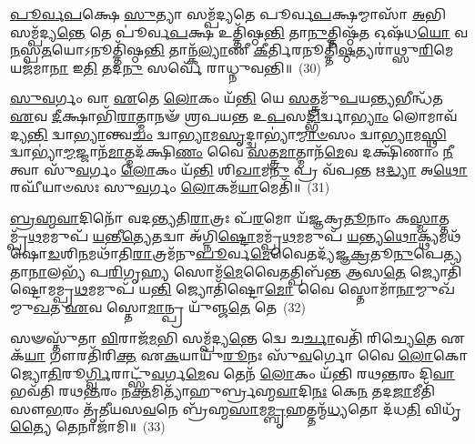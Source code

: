 \-\ul{𑌪𑍂}\-\-\ul{𑌰𑍍𑌵}\-\-\ul{𑌪}\-𑌕𑍍𑌷𑍇 \ul{𑌸𑍁}\-𑌤𑍍𑌯𑌾 𑌸𑌮𑍍𑌪᳴𑌦𑍍𑌯𑌤𑍇 𑌪𑍂𑌰𑍍𑌵\-\ul{𑌪}\-𑌕𑍍𑌷𑌮𑍍𑌮𑌾𑌸𑌾᳴ \ul{𑌅}\-𑌭𑌿 𑌸𑌮𑍍𑌪᳴𑌦𑍍𑌯\-\ul{𑌨𑍍𑌤𑍇} 𑌤𑍇 𑌪𑍂॑𑌰𑍍𑌵\-\ul{𑌪}\-𑌕𑍍𑌷 𑌉𑌤𑍍𑌤𑌿᳴𑌷𑍍𑌠\-\ul{𑌨𑍍𑌤𑌿} 𑌤𑌾\-\ul{𑌨𑍁}\-𑌤𑍍𑌤𑌿𑌷𑍍𑌠᳴\-\ul{𑌤} 𑌓𑌷᳴𑌧\-\ul{𑌯𑍋} 𑌵\-\ul{𑌨}\-𑌸𑍍𑌪\-\ul{𑌤}\-𑌯𑍋\-𑌽𑌨𑍂𑌤𑍍𑌤𑌿᳴𑌷𑍍𑌠\-\ul{𑌨𑍍𑌤𑌿} 𑌤𑌾𑌨𑍍𑌕᳴\-\ul{𑌲𑍍𑌯𑌾}\-𑌣𑍀 \ul{𑌕𑍀}\-𑌰𑍍𑌤𑌿𑌰𑌨𑍂𑌤𑍍𑌤𑌿᳴\-\ul{𑌷𑍍𑌠}\-𑌤𑍍𑌯𑌰𑌾॑𑌥𑍍𑌸𑍁\-\ul{𑌰𑌿}\-𑌮𑍇 𑌯𑌜᳴𑌮𑌾\-\ul{𑌨𑌾} 𑌇\-\ul{𑌤𑌿} 𑌤𑌦\-\ul{𑌨𑍁} 𑌸𑌰𑍍𑌵𑍇᳴ 𑌰𑌾𑌧𑍍𑌨𑍁𑌵𑌨𑍍𑌤𑌿॥~(30)

{\anuvakamend[{\-\ul{𑌏}\-𑌤\-\ul{𑌚𑍍𑌛}\-𑌮𑍍𑌬𑌟𑍍𑌕𑍁᳴𑌰𑍍𑌵\-\ul{𑌨𑍍𑌤𑌿} 𑌤𑍇\-\ul{𑌷𑌾}\-𑌞𑍍𑌚𑌤𑍁᳴𑌸𑍍𑌤𑍍𑌰𑌿𑍞𑌶𑌚𑍍𑌚}]}%

\-\ul{𑌸𑍁}\-\-\ul{𑌵}\-𑌰𑍍𑌗𑌂 𑌵𑌾 \ul{𑌏}\-𑌤𑍇 \ul{𑌲𑍋}\-𑌕𑌂 𑌯᳴\-\ul{𑌨𑍍𑌤𑌿} 𑌯𑍇 \ul{𑌸}\-𑌤𑍍𑌤𑍍𑌰𑌮𑍁᳴\-\ul{𑌪}\-𑌯\-\ul{𑌨𑍍𑌤𑍍𑌯}\-𑌭𑍀𑌨𑍍𑌧᳴𑌤 \ul{𑌏}\-𑌵 \ul{𑌦𑍀}\-𑌕𑍍𑌷𑌾𑌭𑌿᳴\-\ul{𑌰𑌾}\-𑌤𑍍𑌮𑌾𑌨𑍟᳴ 𑌶𑍍𑌰𑌪𑌯𑌨𑍍𑌤 𑌉\-\ul{𑌪}\-𑌸\-\ul{𑌦𑍍𑌭𑌿}\-𑌰𑍍𑌦𑍍𑌵𑌾\-\ul{𑌭𑍍𑌯𑌾𑌂} 𑌲𑍋𑌮𑌾𑌵᳴ 𑌦𑍍𑌯\-\ul{𑌨𑍍𑌤𑌿} 𑌦𑍍𑌵𑌾\-\ul{𑌭𑍍𑌯𑌾}\-𑌨𑍍𑌤𑍍𑌵\-\ul{𑌚𑌂} 𑌦𑍍𑌵𑌾\-\ul{𑌭𑍍𑌯𑌾}\-𑌮\-\ul{𑌸𑍃}\-𑌦𑍍𑌦𑍍𑌵𑌾𑌭𑍍𑌯𑌾॑\-\ul{𑌮𑍍𑌮𑌾}\-\-\ul{𑍞}\-𑌸𑌂 𑌦𑍍𑌵𑌾\-\ul{𑌭𑍍𑌯𑌾}\-𑌮\-\ul{𑌸𑍍𑌥𑌿} 𑌦𑍍𑌵𑌾𑌭𑍍𑌯𑌾॑\-\ul{𑌮𑍍𑌮}\-𑌜𑍍𑌜𑌾𑌨᳴\-\ul{𑌮𑌾}\-𑌤𑍍𑌮𑌦᳴𑌕𑍍𑌷𑌿\-\ul{𑌣𑌂} 𑌵𑍈 \ul{𑌸}\-𑌤𑍍𑌤𑍍𑌰\-\ul{𑌮𑌾}\-𑌤𑍍𑌮𑌾𑌨᳴\-\ul{𑌮𑍇}\-𑌵 𑌦𑌕𑍍𑌷𑌿᳴𑌣𑌾𑌂 \ul{𑌨𑍀}\-𑌤𑍍𑌵𑌾 𑌸𑍁᳴\-\ul{𑌵}\-𑌰𑍍𑌗𑌂 \ul{𑌲𑍋}\-𑌕𑌂 𑌯᳴\-\ul{𑌨𑍍𑌤𑌿} 𑌶𑌿\-\ul{𑌖𑌾}\-𑌮\-\ul{𑌨𑍁} 𑌪𑍍𑌰 𑌵᳴𑌪\-\ul{𑌨𑍍𑌤} 𑌋\-\ul{𑌦𑍍𑌧𑍍𑌯𑌾} 𑌅\-\ul{𑌥𑍋} 𑌰𑌘𑍀᳴𑌯𑌾𑍞𑌸𑌃 𑌸𑍁\-\ul{𑌵}\-𑌰𑍍𑌗𑌂 \ul{𑌲𑍋}\-𑌕𑌮᳴\-\ul{𑌯𑌾}\-𑌮𑍇𑌤𑌿᳴॥~(31)

{\anuvakamend[{\-\ul{𑌸𑍁}\-\-\ul{𑌵}\-𑌰𑍍𑌗𑌮𑍍𑌪᳴\-\ul{𑌞𑍍𑌚𑌾}\-𑌶𑌤𑍍}]}%

\-\ul{𑌬𑍍𑌰}\-\-\ul{𑌹𑍍𑌮}\-\-\ul{𑌵𑌾}\-𑌦𑌿𑌨𑍋᳴ 𑌵𑌦𑌨𑍍𑌤𑍍𑌯𑌤𑌿\-\ul{𑌰𑌾}\-𑌤𑍍𑌰𑌃 𑌪᳴\-\ul{𑌰}\-𑌮𑍋 𑌯᳴𑌜𑍍𑌞𑌕𑍍𑌰\-\ul{𑌤𑍂}\-𑌨𑌾𑌂 𑌕\-\ul{𑌸𑍍𑌮𑌾}\-𑌤𑍍𑌤𑌮𑍍𑌪𑍍𑌰᳴\-\ul{𑌥}\-𑌮𑌮𑍁𑌪᳴ \ul{𑌯}\-𑌨𑍍𑌤𑍀\-\ul{𑌤𑍍𑌯𑍇}\-𑌤𑌦𑍍𑌵𑌾 𑌅᳴𑌗𑍍𑌨𑌿\-\ul{𑌷𑍍𑌟𑍋}\-𑌮𑌮𑍍𑌪𑍍𑌰᳴\-\ul{𑌥}\-𑌮𑌮𑍁𑌪᳴ \ul{𑌯}\-𑌨𑍍𑌤𑍍𑌯\-\ul{𑌥𑍋}\-𑌕𑍍𑌥𑍍𑌯᳴𑌮𑌥᳴ 𑌷𑍋\-\ul{𑌡}\-𑌶𑌿\-\ul{𑌨}\-𑌮𑌥𑌾᳴𑌤𑌿\-\ul{𑌰𑌾}\-𑌤𑍍𑌰𑌮᳴𑌨𑍁\-\ul{𑌪𑍂}\-𑌰𑍍𑌵\-\ul{𑌮𑍇}\-𑌵𑍈𑌤𑌦𑍍𑌯᳴𑌜𑍍𑌞\-\ul{𑌕𑍍𑌰}\-𑌤𑍂\-\ul{𑌨𑍁}\-𑌪𑍇\-\ul{𑌤𑍍𑌯} 𑌤𑌾\-\ul{𑌨𑌾}\-𑌲𑌭𑍍𑌯᳴ 𑌪\-\ul{𑌰𑌿}\-𑌗𑍃\-\ul{𑌹𑍍𑌯} 𑌸𑍋𑌮᳴\-\ul{𑌮𑍇}\-𑌵𑍈𑌤𑌤𑍍𑌪𑌿𑌬᳴𑌨𑍍𑌤 𑌆𑌸\-\ul{𑌤𑍇} 𑌜𑍍𑌯𑍋𑌤𑌿᳴𑌷𑍍𑌟𑍋𑌮𑌮𑍍𑌪𑍍𑌰\-\ul{𑌥}\-𑌮𑌮𑍁𑌪᳴ 𑌯\-\ul{𑌨𑍍𑌤𑌿} 𑌜𑍍𑌯𑍋𑌤𑌿᳴𑌷𑍍𑌟𑍋\-\ul{𑌮𑍋} 𑌵𑍈 𑌸𑍍𑌤𑍋𑌮𑌾᳴\-\ul{𑌨𑌾}\-𑌮𑍍𑌮𑍁𑌖᳴𑌮𑍍𑌮𑍁\-\ul{𑌖}\-𑌤 \ul{𑌏}\-𑌵 𑌸𑍍𑌤𑍋\-\ul{𑌮𑌾}\-𑌨𑍍𑌪𑍍𑌰 𑌯𑍁᳴𑌞𑍍𑌜\-\ul{𑌤𑍇} 𑌤𑍇~(32)

𑌸𑍟𑌸𑍍𑌤𑍁᳴𑌤𑌾 \ul{𑌵𑌿}\-𑌰𑌾𑌜᳴\-\ul{𑌮}\-𑌭𑌿 𑌸𑌮𑍍𑌪᳴𑌦𑍍𑌯\-\ul{𑌨𑍍𑌤𑍇} 𑌦𑍍𑌵𑍇 𑌚\-\ul{𑌰𑍍𑌚𑌾}\-𑌵𑌤𑌿᳴ 𑌰𑌿𑌚𑍍𑌯𑍇\-\ul{𑌤𑍇} 𑌏𑌕᳴\-\ul{𑌯𑌾} 𑌗𑍗𑌰𑌤𑌿᳴𑌰𑌿\-\ul{𑌕𑍍𑌤} 𑌏\-\ul{𑌕}\-𑌯𑌾𑌯𑍁᳴\-\ul{𑌰𑍂}\-𑌨𑌃 𑌸𑍁᳴\-\ul{𑌵}\-𑌰𑍍𑌗𑍋 𑌵𑍈 \ul{𑌲𑍋}\-𑌕𑍋 𑌜𑍍𑌯𑍋\-\ul{𑌤𑌿}\-𑌰𑍂\-\ul{𑌰𑍍𑌗𑍍𑌵𑌿}\-𑌰𑌾𑌟𑍍𑌸𑍁᳴\-\ul{𑌵}\-𑌰𑍍𑌗\-\ul{𑌮𑍇}\-𑌵 𑌤𑍇𑌨᳴ \ul{𑌲𑍋}\-𑌕𑌂 𑌯᳴𑌨𑍍𑌤𑌿 𑌰𑌥\-\ul{𑌨𑍍𑌤}\-𑌰𑌂 𑌦𑌿\-\ul{𑌵𑌾} 𑌭𑌵᳴𑌤𑌿 𑌰𑌥\-\ul{𑌨𑍍𑌤}\-𑌰𑌂 𑌨\-\ul{𑌕𑍍𑌤}\-𑌮𑌿𑌤𑍍𑌯𑌾᳴𑌹𑍁𑌰𑍍𑌬𑍍𑌰𑌹𑍍𑌮\-\ul{𑌵𑌾}\-𑌦𑌿\-\ul{𑌨𑌃} 𑌕𑍇\-\ul{𑌨} 𑌤𑌦\-\ul{𑌜𑌾}\-𑌮𑍀𑌤𑌿᳴ 𑌸𑍗\-\ul{𑌭}\-𑌰𑌂 𑌤𑍃᳴𑌤𑍀𑌯𑌸\-\ul{𑌵}\-𑌨𑍇 𑌬𑍍𑌰᳴𑌹𑍍𑌮\-\ul{𑌸𑌾}\-𑌮\-\ul{𑌮𑍍𑌬𑍃}\-𑌹𑌤𑍍𑌤𑌨𑍍𑌮᳴\-\ul{𑌧𑍍𑌯}\-𑌤𑍋 𑌦᳴𑌧\-\ul{𑌤𑌿} 𑌵𑌿𑌧𑍃᳴\-\ul{𑌤𑍍𑌯𑍈} 𑌤𑍇𑌨𑌾𑌜𑌾᳴𑌮𑌿॥~(33)

